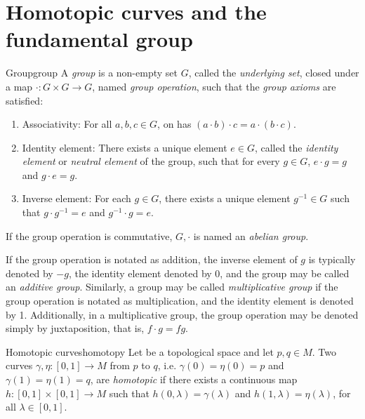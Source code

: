 \section{Homotopic curves and the fundamental group}

\begin{definition}{Group}{group}
    A \emph{group} is a non-empty set \(G\), called the \emph{underlying set}, closed under a map \(\cdot : G \times G \to G\), named \emph{group operation}, such that the \emph{group axioms} are satisfied:
    \begin{enumerate}[label=(\alph*)]
        \item Associativity: For all \(a,b,c \in G\), on has \((a\cdot b)\cdot c = a \cdot (b\cdot c)\).
        \item Identity element: There exists a unique element \(e \in G\), called the \emph{identity element} or \emph{neutral element} of the group, such that for every \(g \in G\), \(e \cdot g = g\) and \(g \cdot e = g\).
        \item Inverse element: For each \(g \in G\), there exists a unique element \(g^{-1} \in G\) such that \(g \cdot g^{-1} = e\) and \(g^{-1} \cdot g = e\).
    \end{enumerate}
    If the group operation is commutative, \(G, \cdot\) is named an \emph{abelian group}.
\end{definition}
\begin{remark}
     If the group operation is notated as addition, the inverse element of \(g\) is typically denoted by \(-g\), the identity element denoted by 0, and the group may be called an \emph{additive group}. Similarly, a group may be called \emph{multiplicative group} if the group operation is notated as multiplication, and the identity element is denoted by 1. Additionally, in a multiplicative group, the group operation may be denoted simply by juxtaposition, that is, \(f \cdot g = fg\).
\end{remark}

\begin{definition}{Homotopic curves}{homotopy}
    Let  be a topological space and let \(p, q \in M\). Two curves \(\gamma,\eta: [0,1]\to M\) from \(p\) to \(q\), i.e. \(\gamma(0) = \eta(0) = p\) and \(\gamma(1) = \eta(1) = q\), are \emph{homotopic} if there exists a continuous map \(h : [0,1] \times [0,1] \to M\) such that \(h(0, \lambda) = \gamma(\lambda)\) and \(h(1, \lambda) = \eta(\lambda)\), for all \(\lambda \in [0,1]\).
\end{definition}

